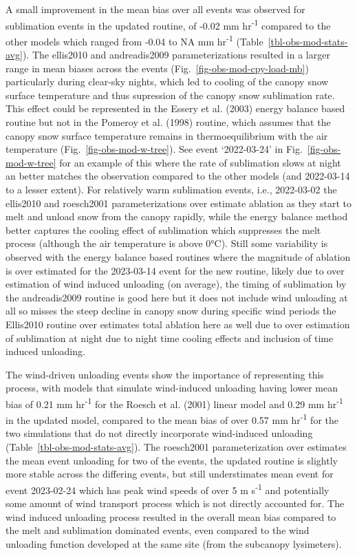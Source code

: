 \documentclass[
  letterpaper,
  DIV=11,
  numbers=noendperiod]{scrartcl}
\begin{document}
A small improvement in the mean bias over all events was observed for
sublimation events in the updated routine, of -0.02 mm
hr\textsuperscript{-1} compared to the other models which ranged from
-0.04 to NA mm hr\textsuperscript{-1}
(Table~\ref{tbl-obs-mod-stats-avg}). The ellis2010 and andreadis2009
parameterizations resulted in a larger range in mean biases across the
events (Fig.~\ref{fig-obs-mod-cpy-load-mb}) particularly during
clear-sky nights, which led to cooling of the canopy snow surface
temperature and thus supression of the canopy snow sublimation rate.
This effect could be represented in the Essery et al. (2003) energy
balance based routine but not in the Pomeroy et al. (1998) routine,
which assumes that the canopy snow surface temperature remains in
thermoequilibrium with the air temperature
(Fig.~\ref{fig-obs-mod-w-tree}). See event `2022-03-24' in
Fig.~\ref{fig-obs-mod-w-tree} for an example of this where the rate of
sublimation slows at night an better matches the observation compared to
the other models (and 2022-03-14 to a lesser extent). For relatively
warm sublimation events, i.e., 2022-03-02 the ellis2010 and roesch2001
parameterizations over estimate ablation as they start to melt and
unload snow from the canopy rapidly, while the energy balance method
better captures the cooling effect of sublimation which suppresses the
melt process (although the air temperature is above 0°C). Still some
variability is observed with the energy balance based routines where the
magnitude of ablation is over estimated for the 2023-03-14 event for the
new routine, likely due to over estimation of wind induced unloading (on
average), the timing of sublimation by the andreadis2009 routine is good
here but it does not include wind unloading at all so misses the steep
decline in canopy snow during specific wind periods the Ellis2010
routine over estimates total ablation here as well due to over
estimation of sublimation at night due to night time cooling effects and
inclusion of time induced unloading.

The wind-driven unloading events show the importance of representing
this process, with models that simulate wind-induced unloading having
lower mean bias of 0.21 mm hr\textsuperscript{-1} for the Roesch et al.
(2001) linear model and 0.29 mm hr\textsuperscript{-1} in the updated
model, compared to the mean bias of over 0.57 mm hr\textsuperscript{-1}
for the two simulations that do not directly incorporate wind-induced
unloading (Table~\ref{tbl-obs-mod-stats-avg}). The roesch2001
parameterization over estimates the mean event unloading for two of the
events, the updated routine is slightly more stable across the differing
events, but still understimates mean event for event 2023-02-24 which
has peak wind speeds of over 5 m s\textsuperscript{-1} and potentially
some amount of wind transport process which is not directly accounted
for. The wind induced unloading process resulted in the overall mean
bias compared to the melt and sublimation dominated events, even
compared to the wind unloading function developed at the same site (from
the subcanopy lysimeters).
\end{document}
